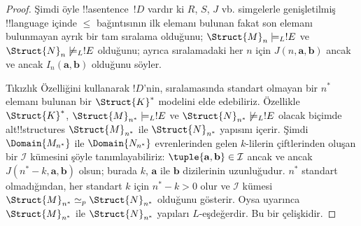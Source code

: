 \begin{proof}
Şimdi öyle !!a{sentence}~$!D$ vardır ki $R$, $S$, $J$ vb. simgelerle
genişletilmiş !!{language} içinde $\leq$ bağıntısının ilk elemanı bulunan fakat
son elemanı bulunmayan ayrık bir tam sıralama olduğunu;
$\Struct{M}_n\models_L !E$ ve $\Struct{N}_n\not\models_L !E$ olduğunu; ayrıca
sıralamadaki her $n$ için $J(n,\mathbf a,\mathbf b)$ ancak ve ancak
$I_n(\mathbf a,\mathbf b)$ olduğunu söyler.

Tıkızlık Özelliğini kullanarak $!D$'nin, sıralamasında standart olmayan bir
$n^*$ elemanı bulunan bir $\Struct{K}^*$ modelini elde edebiliriz. Özellikle
$\Struct{K}^*$, $\Struct{M}_{n^*}\models_L !E$ ve
$\Struct{N}_{n^*}\not\models_L !E$ olacak biçimde alt!!{structure}s
$\Struct{M}_{n^*}$ ile $\Struct{N}_{n^*}$ yapısını içerir. Şimdi
$\Domain{M_{n^*}}$ ile $\Domain{N_{n^*}}$ evrenlerinden gelen $k$-lilerin
çiftlerinden oluşan bir $\mathcal I$ kümesini şöyle tanımlayabiliriz:
$\tuple{\mathbf a,\mathbf b}\in\mathcal I$ ancak ve ancak
$J(n^*-k,\mathbf a,\mathbf b)$ olsun; burada $k$, $\mathbf a$ ile
$\mathbf b$ dizilerinin uzunluğudur. $n^*$ standart olmadığından, her
standart $k$ için $n^*-k>0$ olur ve $\mathcal I$ kümesi
$\Struct{M}_{n^*}\simeq_p\Struct{N}_{n^*}$ olduğunu gösterir. Oysa
 uyarınca $\Struct{M}_{n^*}$ ile
$\Struct{N}_{n^*}$ yapıları $L$-eşdeğerdir. Bu bir çelişkidir.
\end{proof}

